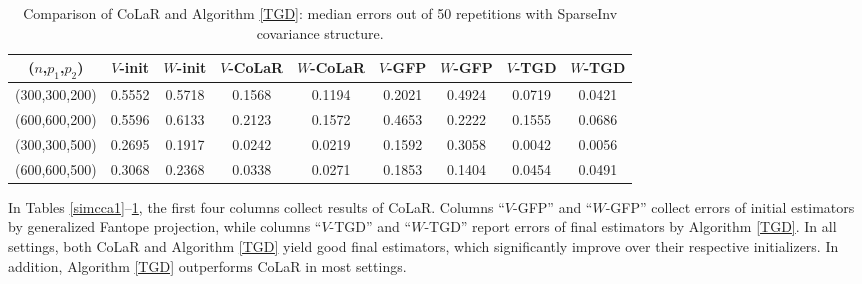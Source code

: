 \documentclass[11pt]{article}
\newcommand{\0}{{\mathbf{0}}}
\begin{document}
\begin{table}[!tb]
\begin{tabular}{c|cc|cc|cc|cc}
\hline
 {($n$,$p_1$,$p_2$)} &  {$V$-init} &  {$W$-init} &  {$V$-CoLaR} &  {$W$-CoLaR} &  {$V$-GFP} &  {$W$-GFP} &  {$V$-TGD} &  {$W$-TGD} \\ \hline
 {(300,300,200)}      & 0.5552              & 0.5718              & 0.1568           & 0.1194           & 0.2021        & 0.4924        & 0.0719         & 0.0421         \\ 
 {(600,600,200)}      & 0.5596              & 0.6133              & 0.2123           & 0.1572           & 0.4653        & 0.2222        & 0.1555         & 0.0686         \\ 
 {(300,300,500)}      & 0.2695              & 0.1917              & 0.0242           & 0.0219           & 0.1592        & 0.3058        & 0.0042         & 0.0056         \\ 
 {(600,600,500)}      & 0.3068              & 0.2368              & 0.0338           & 0.0271           & 0.1853        & 0.1404        & 0.0454         & 0.0491         \\ \hline
\end{tabular}
\caption{Comparison of CoLaR and Algorithm \ref{TGD}: median errors out of 50 repetitions with SparseInv covariance structure. 
}
\label{simcca3}
\end{table}



\par In Tables \ref{simcca1}--\ref{simcca3}, the first four columns collect results of CoLaR. 
Columns ``$V$-GFP'' and ``$W$-GFP'' collect errors of initial estimators by generalized Fantope projection, while 
columns ``$V$-TGD'' and ``$W$-TGD'' report errors of final estimators by Algorithm \ref{TGD}. 
In all settings, both CoLaR and Algorithm \ref{TGD} yield good final estimators, which significantly improve over their respective initializers. 
In addition, Algorithm \ref{TGD} outperforms CoLaR in most settings. 
\end{document}

